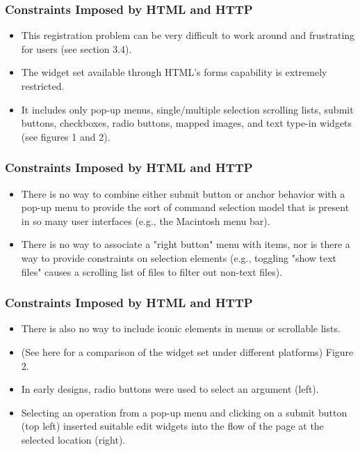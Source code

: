 \documentclass{beamer}
\begin{document}
\begin{frame}
\frametitle{Constraints Imposed by HTML and HTTP}

\begin{itemize}
\item This registration problem can be very difficult to work around and frustrating for users (see section 3.4).
\item The widget set available through HTML's forms capability is extremely restricted.
\item It includes only pop-up menus, single/multiple selection scrolling lists, submit buttons, checkboxes, radio buttons, mapped images, and text type-in widgets (see figures 1 and 2).
\end{itemize}

\end{frame}

\begin{frame}
\frametitle{Constraints Imposed by HTML and HTTP}

\begin{itemize}
\item There is no way to combine either submit button or anchor behavior with a pop-up menu to provide the sort of command selection model that is present in so many user interfaces (e.g., the Macintosh menu bar).
\item There is no way to associate a "right button" menu with items, nor is there a way to provide constraints on selection elements (e.g., toggling "show text files" causes a scrolling list of files to filter out non-text files).
\end{itemize}

\end{frame}

\begin{frame}
\frametitle{Constraints Imposed by HTML and HTTP}

\begin{itemize}
\item There is also no way to include iconic elements in menus or scrollable lists.
\item (See here for a comparison of the widget set under different platforms) Figure 2.
\item In early designs, radio buttons were used to select an argument (left).
\item Selecting an operation from a pop-up menu and clicking on a submit button (top left) inserted suitable edit widgets into the flow of the page at the selected location (right).
\end{itemize}

\end{frame}
\end{document}
